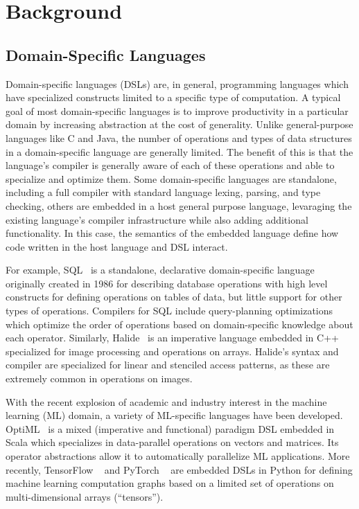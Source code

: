 \chapter{Background}
\label{background}

\section{Domain-Specific Languages}
Domain-specific languages (DSLs) are, in general, programming languages which have specialized
constructs limited to a specific type of computation. A typical goal of
most domain-specific languages is to improve productivity in a particular domain
by increasing abstraction at the cost of generality. Unlike general-purpose languages like C and Java,
the number of operations and types of data structures in a domain-specific language
are generally limited. The benefit of this is that the language's compiler is
generally aware of each of these operations and able to specialize and optimize them.
Some domain-specific languages are standalone, including a full compiler with standard language
lexing, parsing, and type checking, others are embedded in a host general purpose language,
levaraging the existing language's compiler infrastructure while also
adding additional functionality. In this case, the semantics of the embedded language
define how code written in the host language and DSL interact.

For example, SQL~\cite{sql} is a standalone, declarative
domain-specific language originally created in 1986 for describing database operations with high level constructs
for defining operations on tables of data, but little support for other types of operations.
Compilers for SQL include query-planning optimizations which optimize the order of
operations based on domain-specific knowledge about each operator.
Similarly, Halide~\cite{pldi13halide} is an imperative language embedded in C++ specialized for image processing
and operations on arrays. Halide's syntax and compiler are specialized for linear and stenciled access patterns,
as these are extremely common in operations on images.

With the recent explosion of academic and industry interest in the machine learning (ML) domain,
a variety of ML-specific languages have been developed.
OptiML~\cite{optiml} is a mixed (imperative and functional) paradigm DSL embedded in Scala
which specializes in data-parallel operations on vectors and matrices.
Its operator abstractions allow it to automatically parallelize ML applications.
More recently, TensorFlow ~\cite{tensorflow} and PyTorch ~\cite{pytorch} are
embedded DSLs in Python for defining machine learning computation graphs based on
a limited set of operations on multi-dimensional arrays (``tensors'').

